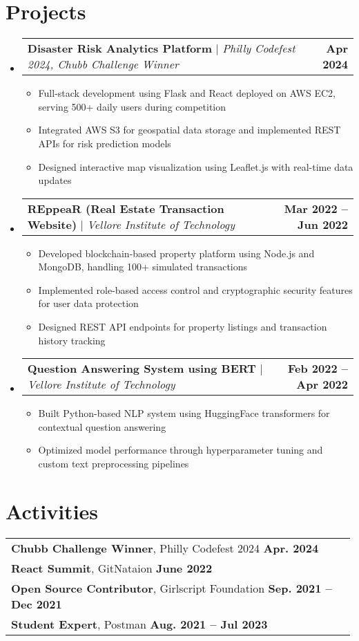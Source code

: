 \documentclass[letterpaper,11pt]{article}
\makeatletter
\newcommand{\resumeItem}[1]{
  \item\small{
    {#1 \vspace{-2pt}}
  }
}
\newcommand{\resumeProjectHeading}[2]{
    \item
    \begin{tabular*}{1.001\textwidth}{l@{\extracolsep{\fill}}r}
      \small#1 & \textbf{\small #2}\\
    \end{tabular*}\vspace{-3pt}
}
\newcommand{\resumeSubHeadingListStart}{\begin{itemize}[leftmargin=0.0in, label={}]}
\newcommand{\resumeSubHeadingListEnd}{\end{itemize}}
\newcommand{\resumeItemListStart}{\begin{itemize}}
\newcommand{\resumeItemListEnd}{\end{itemize}\vspace{-5pt}}
\makeatother
\begin{document}
\section{Projects}
\vspace{-5pt}
\resumeSubHeadingListStart
    \resumeProjectHeading
    {\textbf{Disaster Risk Analytics Platform} $|$ \emph{Philly Codefest 2024, Chubb Challenge Winner}} {Apr 2024}
    \resumeItemListStart
        \resumeItem{Full-stack development using Flask and React deployed on AWS EC2, serving 500+ daily users during competition}
        \resumeItem{Integrated AWS S3 for geospatial data storage and implemented REST APIs for risk prediction models}
        \resumeItem{Designed interactive map visualization using Leaflet.js with real-time data updates}
    \resumeItemListEnd
    \vspace{-15pt}
    \resumeProjectHeading
    {\textbf{REppeaR (Real Estate Transaction Website)} $|$ \emph{Vellore Institute of Technology}} {Mar 2022 -- Jun 2022}
    \resumeItemListStart
        \resumeItem{Developed blockchain-based property platform using Node.js and MongoDB, handling 100+ simulated transactions}
        \resumeItem{Implemented role-based access control and cryptographic security features for user data protection}
        \resumeItem{Designed REST API endpoints for property listings and transaction history tracking}
    \resumeItemListEnd
    \vspace{-15pt}
    \resumeProjectHeading
    {\textbf{Question Answering System using BERT} $|$ \emph{Vellore Institute of Technology}} {Feb 2022 -- Apr 2022}
    \resumeItemListStart
        \resumeItem{Built Python-based NLP system using HuggingFace transformers for contextual question answering}
        \resumeItem{Optimized model performance through hyperparameter tuning and custom text preprocessing pipelines}
    \resumeItemListEnd
\resumeSubHeadingListEnd

\section{Activities}
\begin{tabular}{p{0.99\linewidth}}
    \hspace{0.15in}\textbf{Chubb Challenge Winner}, Philly Codefest 2024
        \hfill \textbf{Apr. 2024} \\
            \hspace{0.15in}\textbf{React Summit}, GitNataion
        \hfill \textbf{June 2022}\\
    \hspace{0.15in}\textbf{Open Source Contributor}, Girlscript Foundation
        \hfill \textbf{Sep. 2021 -- Dec 2021}\\

    \hspace{0.15in}\textbf{Student Expert}, Postman
        \hfill \textbf{Aug. 2021 -- Jul 2023} 
    
\end{tabular}
\vspace{-15pt}
\end{document}
